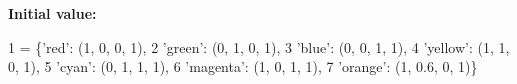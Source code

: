 {\bfseries Initial value\+:}
\begin{DoxyCode}
1 =  \{\textcolor{stringliteral}{'red'}: (1, 0, 0, 1),
2           \textcolor{stringliteral}{'green'}: (0, 1, 0, 1),
3           \textcolor{stringliteral}{'blue'}: (0, 0, 1, 1),
4           \textcolor{stringliteral}{'yellow'}: (1, 1, 0, 1),
5           \textcolor{stringliteral}{'cyan'}: (0, 1, 1, 1),
6           \textcolor{stringliteral}{'magenta'}: (1, 0, 1, 1),
7           \textcolor{stringliteral}{'orange'}: (1, 0.6, 0, 1)\}
\end{DoxyCode}
